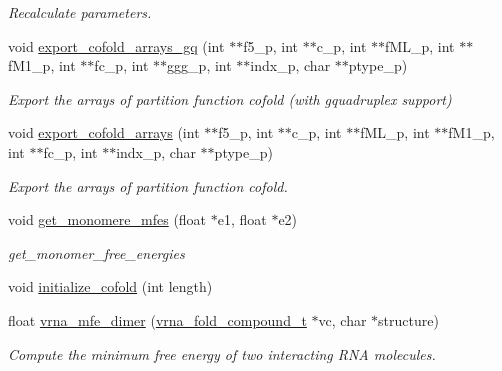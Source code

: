 \begin{DoxyCompactItemize}
\begin{DoxyCompactList}\small\item\em Recalculate parameters. \end{DoxyCompactList}\item 
void \hyperlink{group__mfe__cofold_ga5f5bf4df35d0554f6ace9579f8744c48}{export\+\_\+cofold\+\_\+arrays\+\_\+gq} (int $\ast$$\ast$f5\+\_\+p, int $\ast$$\ast$c\+\_\+p, int $\ast$$\ast$f\+M\+L\+\_\+p, int $\ast$$\ast$f\+M1\+\_\+p, int $\ast$$\ast$fc\+\_\+p, int $\ast$$\ast$ggg\+\_\+p, int $\ast$$\ast$indx\+\_\+p, char $\ast$$\ast$ptype\+\_\+p)
\begin{DoxyCompactList}\small\item\em Export the arrays of partition function cofold (with gquadruplex support) \end{DoxyCompactList}\item 
void \hyperlink{group__mfe__cofold_ga5cb6b59983f1f74ccc00b9b9c4e84482}{export\+\_\+cofold\+\_\+arrays} (int $\ast$$\ast$f5\+\_\+p, int $\ast$$\ast$c\+\_\+p, int $\ast$$\ast$f\+M\+L\+\_\+p, int $\ast$$\ast$f\+M1\+\_\+p, int $\ast$$\ast$fc\+\_\+p, int $\ast$$\ast$indx\+\_\+p, char $\ast$$\ast$ptype\+\_\+p)
\begin{DoxyCompactList}\small\item\em Export the arrays of partition function cofold. \end{DoxyCompactList}\item 
void \hyperlink{group__mfe__cofold_ga4958b517c613e4d2afd5bce6c1060a79}{get\+\_\+monomere\+\_\+mfes} (float $\ast$e1, float $\ast$e2)
\begin{DoxyCompactList}\small\item\em get\+\_\+monomer\+\_\+free\+\_\+energies \end{DoxyCompactList}\item 
void \hyperlink{group__mfe__cofold_gafee0c32208aa2ac97338b6e3fbad7fa5}{initialize\+\_\+cofold} (int length)
\item 
float \hyperlink{group__mfe__cofold_gaab22d10c1190f205f16a77cab9d5d3ee}{vrna\+\_\+mfe\+\_\+dimer} (\hyperlink{group__fold__compound_ga1b0cef17fd40466cef5968eaeeff6166}{vrna\+\_\+fold\+\_\+compound\+\_\+t} $\ast$vc, char $\ast$structure)
\begin{DoxyCompactList}\small\item\em Compute the minimum free energy of two interacting R\+NA molecules. \end{DoxyCompactList}\end{DoxyCompactItemize}


